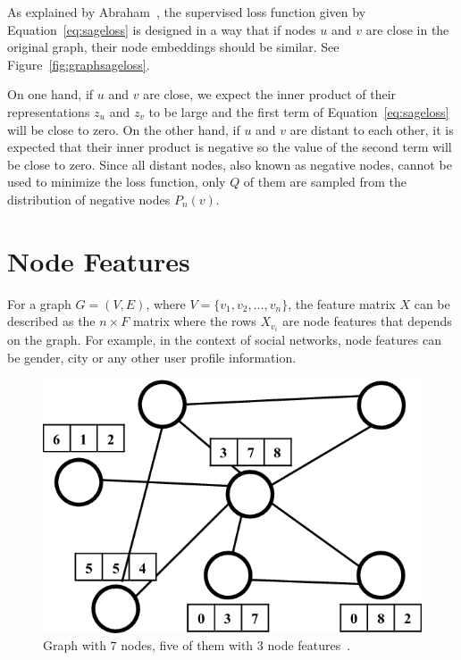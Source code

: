 As explained by Abraham~\cite{unsupervisedloss}, the supervised loss function given by Equation~\ref{eq:sageloss} is designed in a way that if nodes $u$ and $v$ are close in the original graph, their node embeddings should be similar. See Figure~\ref{fig:graphsageloss}. 

On one hand, if $u$ and $v$ are close, we expect the inner product of their representations $z_u$ and $z_v$ to be large and the first term of Equation~\ref{eq:sageloss} will be close to zero. On the other hand, if $u$ and $v$ are distant to each other, it is expected that their inner product is negative so the value of the second term will be close to zero. Since all distant nodes, also known as negative nodes, cannot be used to minimize the loss function, only $Q$ of them are sampled from the distribution of negative nodes $P_n(v)$.



\section{Node Features}
For a graph $G = (V,E)$, where $V=\{v_1, v_2, ..., v_n\}$, the feature matrix $X$ can be described as the $n\times F$ matrix where the rows $X_{v_i}$ are node features that depends on the graph. For example, in the context of social networks, node features can be gender, city or any other user profile information.

\begin{figure}[h!]
    \begin{center}
        \includegraphics[scale=0.35]{node_features.png}
    \end{center}
    \caption{Graph with $7$ nodes, five of them with $3$ node features~\cite{imagenodefeatures}.}
    \label{fig:nodefeatures}
\end{figure}


